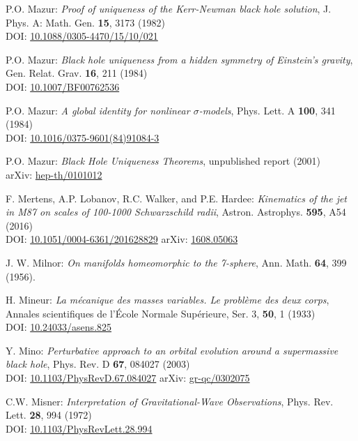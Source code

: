 \begin{thebibliography}{123}
P.O. Mazur:
{\em Proof of uniqueness of the Kerr-Newman black hole solution},
J. Phys. A: Math. Gen. {\bf 15}, 3173 (1982)\\
DOI: \href{https://doi.org/10.1088/0305-4470/15/10/021}{10.1088/0305-4470/15/10/021}

P.O. Mazur:
{\em Black hole uniqueness from a hidden symmetry of Einstein's gravity},
Gen. Relat. Grav. {\bf 16}, 211 (1984)\\
DOI: \href{https://doi.org/10.1007/BF00762536}{10.1007/BF00762536}

P.O. Mazur:
{\em A global identity for nonlinear $\sigma$-models},
Phys. Lett. A {\bf 100}, 341 (1984)\\
DOI: \href{https://doi.org/10.1016/0375-9601(84)91084-3}{10.1016/0375-9601(84)91084-3}

P.O. Mazur:
{\em Black Hole Uniqueness Theorems},
unpublished report (2001)\\
arXiv: \href{https://arxiv.org/abs/hep-th/0101012}{hep-th/0101012}

F. Mertens, A.P. Lobanov, R.C. Walker, and P.E. Hardee:
{\em Kinematics of the jet in M87 on scales of 100-1000 Schwarzschild radii},
Astron. Astrophys. {\bf 595}, A54 (2016)\\
DOI: \href{https://doi.org/10.1051/0004-6361/201628829}{10.1051/0004-6361/201628829}\hfill
arXiv: \href{https://arxiv.org/abs/1608.05063}{1608.05063}

J. W. Milnor: {\em On manifolds homeomorphic to the 7-sphere},
Ann. Math. {\bf 64}, 399 (1956).

H. Mineur: {\em La mécanique des masses variables. Le problème des deux corps},
Annales scientifiques de l'École Normale Supérieure, Ser. 3, {\bf 50}, 1 (1933)\\
DOI: \href{https://doi.org/10.24033/asens.825}{10.24033/asens.825}

Y. Mino:
{\em Perturbative approach to an orbital evolution around a supermassive black hole},
Phys. Rev. D {\bf 67}, 084027 (2003)\\
DOI: \href{https://doi.org/10.1103/PhysRevD.67.084027}{10.1103/PhysRevD.67.084027}\hfill
arXiv: \href{https://arxiv.org/abs/gr-qc/0302075}{gr-qc/0302075}

C.W. Misner:
{\em Interpretation of Gravitational-Wave Observations},
Phys. Rev. Lett. {\bf 28}, 994 (1972)\\
DOI: \href{https://doi.org/10.1103/PhysRevLett.28.994}{10.1103/PhysRevLett.28.994}


\end{thebibliography}

